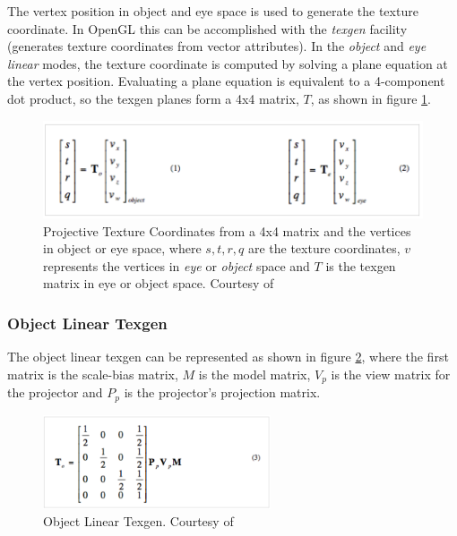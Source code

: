 \documentclass[]{article}
\begin{document}
The vertex position in object and eye space is used to generate the texture coordinate. In OpenGL this can be accomplished with the \textit{texgen} facility (generates texture coordinates from vector attributes). In the \textit{object} and \textit{eye linear} modes, the texture coordinate is computed by solving a plane equation at the vertex position. Evaluating a plane equation is equivalent to a 4-component dot product, so the texgen planes form a 4x4 matrix, $T$, as shown in figure \ref{fig:ProjectiveTextureMapping}.

\begin{figure}[hbtp]
    \centering
    \includegraphics[width=1.0\textwidth]{figures/PTMCoordinates.PNG}
    \caption{Projective Texture Coordinates from a 4x4 matrix and the vertices in object or eye space, where $s, t, r, q$ are the texture coordinates, $v$ represents the vertices in \textit{eye} or \textit{object} space and $T$ is the texgen matrix in eye or object space. Courtesy of \cite{cassNvidia}}
    \label{fig:ProjectiveTextureMapping}
\end{figure}

\subsubsection{Object Linear Texgen}

The object linear texgen can be represented as shown in figure \ref{fig:ObjectLinearTexgen}, where the first matrix is the scale-bias matrix, $M$ is the model matrix, $V_{p}$ is the view matrix for the projector and $P_{p}$ is the projector's projection matrix.

\begin{figure}[hbtp]
    \centering
    \includegraphics[width=0.6\textwidth]{figures/ObjectLinearTexgen.PNG}
    \caption{Object Linear Texgen. Courtesy of \cite{cassNvidia}}
    \label{fig:ObjectLinearTexgen}
\end{figure}
\end{document}

